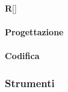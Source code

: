 				\centering\textbf R[]
			
			\paragraph{Progettazione}

			\paragraph*{Codifica}

		\subsubsection{Strumenti}
